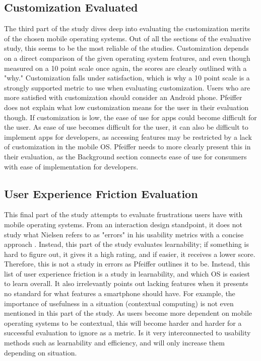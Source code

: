 \documentclass[11pt]{article}
\begin{document}
\subsection{Customization Evaluated}
The third part of the study dives deep into evaluating the customization merits of the chosen mobile operating systems. Out of all the sections of the evaluative study, this seems to be the most reliable of the studies. Customization depends on a direct comparison of the given operating system features, and even though measured on a 10 point scale once again, the scores are clearly outlined with a "why." Customization falls under satisfaction, which is why a 10 point scale is a strongly supported metric to use when evaluating customization. Users who are more satisfied with customization should consider an Android phone. Pfeiffer does not explain what low customization means for the user in their evaluation though. If customization is low, the ease of use for apps could become difficult for the user. As ease of use becomes difficult for the user, it can also be difficult to implement apps for developers, as accessing features may be restricted by a lack of customization in the mobile OS. Pfeiffer needs to more clearly present this in their evaluation, as the Background section connects ease of use for consumers with ease of implementation for developers.
%
\subsection{User Experience Friction Evaluation}
This final part of the study attempts to evaluate frustrations users have with mobile operating systems. From an interaction design standpoint, it does not study what Nielsen refers to as "errors" in his usability metrics with a concise approach \cite{Nielsen}. Instead, this part of the study evaluates learnability; if something is hard to figure out, it gives it a high rating, and if easier, it receives a lower score. Therefore, this is not a study in errors as Pfeiffer outlines it to be. Instead, this list of user experience friction is a study in learnability, and which OS is easiest to learn overall. It also irrelevantly points out lacking features when it presents no standard for what features a smartphone should have. For example, the importance of usefulness in a situation (contextual computing) is not even mentioned in this part of the study. As users become more dependent on mobile operating systems to be contextual, this will become harder and harder for a successful evaluation to ignore as a metric. Is it very interconnected to usability methods such as learnability and efficiency, and will only increase them depending on situation.
\end{document}
